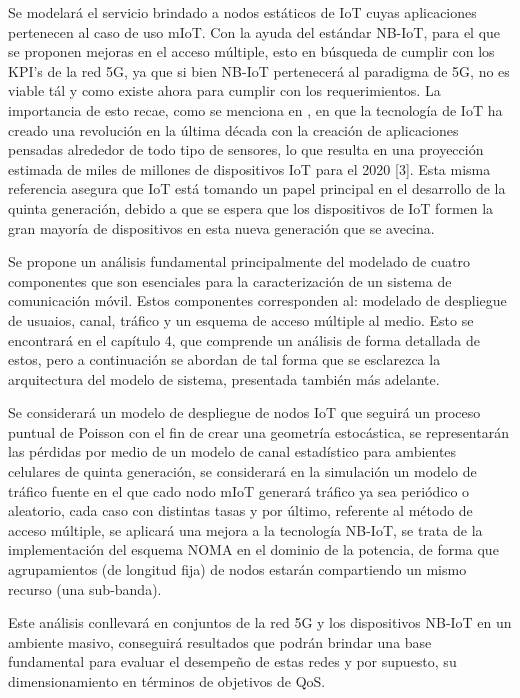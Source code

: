 Se modelará el servicio brindado a nodos estáticos de IoT cuyas aplicaciones pertenecen al caso de uso mIoT. Con la ayuda del estándar NB-IoT, para el que se proponen mejoras en el acceso múltiple, esto en búsqueda de cumplir con los KPI’s de la red 5G, ya que si bien NB-IoT pertenecerá al paradigma de 5G, no es viable tál y como existe ahora para cumplir con los requerimientos. La importancia de esto recae, como se menciona en \parencite{EjazIoT}, en que la tecnología de IoT ha creado una revolución en la última década con la creación de aplicaciones pensadas alrededor de todo tipo de sensores, lo que resulta en una proyección estimada de miles de millones de dispositivos IoT para el 2020 [3]. Esta misma referencia asegura que IoT está tomando un papel principal en el desarrollo de la quinta generación, debido a que se espera que los dispositivos de IoT formen la gran mayoría de dispositivos en esta nueva generación que se avecina.\newline

Se propone un análisis fundamental principalmente del modelado de cuatro componentes que son esenciales para la caracterización de un sistema de comunicación móvil. Estos componentes corresponden al: modelado de despliegue de usuaios, canal, tráfico y un esquema de acceso múltiple al medio. Esto se encontrará en el capítulo 4, que comprende un análisis de forma detallada de estos, pero a continuación se abordan de tal forma que se esclarezca la arquitectura del modelo de sistema, presentada también más adelante.\newline

Se considerará un modelo de despliegue de nodos IoT que seguirá un proceso puntual de Poisson con el fin de crear una geometría estocástica, se representarán las pérdidas por medio de un modelo de canal estadístico para ambientes celulares de quinta generación, se considerará en la simulación un modelo de tráfico fuente en el que cado nodo mIoT generará tráfico ya sea periódico o aleatorio, cada caso con distintas tasas y por último, referente al método de acceso múltiple, se aplicará una mejora a la tecnología NB-IoT, se trata de la implementación del esquema NOMA en el dominio de la potencia, de forma que agrupamientos (de longitud fija) de nodos estarán compartiendo un mismo recurso (una sub-banda).\newline

Este análisis conllevará en conjuntos de la red 5G y los dispositivos NB-IoT en un ambiente masivo, conseguirá resultados que podrán brindar una base fundamental para evaluar el desempeño de estas redes y por supuesto, su dimensionamiento en términos de objetivos de QoS.\newline

